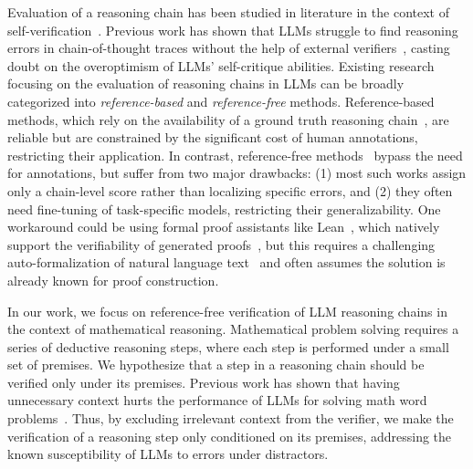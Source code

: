 Evaluation of a reasoning chain has been studied in literature in the context of self-verification~\cite{weng-etal-2023-large}. Previous work has shown that LLMs struggle to find reasoning errors in chain-of-thought traces without the help of external verifiers~\cite{stechly2024selfverificationlimitationslargelanguage, wu-etal-2024-large, tyen-etal-2024-llms}, casting doubt on the overoptimism of LLMs’ self-critique abilities. Existing research focusing on the evaluation of reasoning chains in LLMs can be broadly categorized into \textit{reference-based} and \textit{reference-free} methods. Reference-based methods, which rely on the availability of a ground truth reasoning chain~\cite{welleck2021naturalproofs, han2024folionaturallanguagereasoning, tian-etal-2021-diagnosing}, are reliable but are constrained by the significant cost of human annotations, restricting their application. In contrast, reference-free methods~\cite{prasad2023recevalevaluatingreasoningchains, golovneva2023roscoesuitemetricsscoring, zhu2024deductivebeamsearchdecoding} bypass the need for annotations, but suffer from two major drawbacks: (1) most such works assign only a chain-level score rather than localizing specific errors, and (2) they often need fine-tuning of task-specific models, restricting their generalizability. One workaround could be using formal proof assistants like Lean~\cite{10.1007/978-3-030-79876-5_37}, which natively support the verifiability of generated proofs~\cite{yang2024formalmathematicalreasoningnew, yang2023leandojotheoremprovingretrievalaugmented, murphy2024autoformalizingeuclideangeometry}, but this requires a challenging auto-formalization of natural language text~\cite{wu2022autoformalizationlargelanguagemodels} and often assumes the solution is already known for proof construction. 

In our work, we focus on reference-free verification of LLM reasoning chains in the context of mathematical reasoning. Mathematical problem solving requires a series of deductive reasoning steps, where each step is performed under a small set of premises. We hypothesize that a step in a reasoning chain should be verified only under its premises. Previous work has shown that having unnecessary context hurts the performance of LLMs for solving math word problems~\cite{10.5555/3618408.3619699}. Thus, by excluding irrelevant context from the verifier, we make the verification of a reasoning step only conditioned on its premises, addressing the known susceptibility of LLMs to errors under distractors. 

